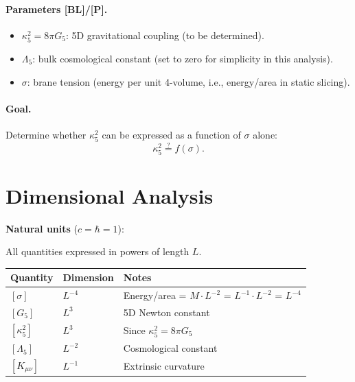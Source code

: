 \documentclass[11pt,a4paper]{article}
\newcommand{\tagBL}{\textcolor{blue!70!black}{[BL]}}
\newcommand{\tagP}{\textcolor{orange!80!black}{[P]}}
\begin{document}
\paragraph{Parameters \tagBL{}/\tagP{}.}
\begin{itemize}[nosep]
    \item $\kappa_5^2 = 8\pi G_5$: 5D gravitational coupling (to be determined).
    \item $\Lambda_5$: bulk cosmological constant (set to zero for simplicity in this analysis).
    \item $\sigma$: brane tension (energy per unit 4-volume, i.e., energy/area in static slicing).
\end{itemize}

\paragraph{Goal.}
Determine whether $\kappa_5^2$ can be expressed as a function of $\sigma$ alone:
\begin{equation}
    \kappa_5^2 \stackrel{?}{=} f(\sigma).
    \label{eq:goal}
\end{equation}

\section{Dimensional Analysis}
\label{sec:dimensions}

\begin{dimbox}
\textbf{Natural units} ($c = \hbar = 1$):

All quantities expressed in powers of length $L$.
\begin{center}
\renewcommand{\arraystretch}{1.2}
\begin{tabular}{lll}
\toprule
\textbf{Quantity} & \textbf{Dimension} & \textbf{Notes} \\
\midrule
$[\sigma]$ & $L^{-4}$ & Energy/area = $M \cdot L^{-2}$ = $L^{-1} \cdot L^{-2}$ = $L^{-4}$ \\
$[G_5]$ & $L^{3}$ & 5D Newton constant \\
$[\kappa_5^2]$ & $L^{3}$ & Since $\kappa_5^2 = 8\pi G_5$ \\
$[\Lambda_5]$ & $L^{-2}$ & Cosmological constant \\
$[K_{\mu\nu}]$ & $L^{-1}$ & Extrinsic curvature \\
\bottomrule
\end{tabular}
\end{center}
\end{dimbox}
\end{document}

